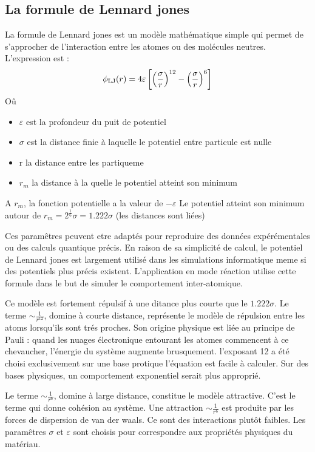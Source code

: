 \subsection{La formule de Lennard jones }
La formule de Lennard jones est un modèle mathématique simple qui permet de s'approcher de l'interaction entre les atomes ou des molécules neutres. 
L'expression est :
 \begin{displaymath} \phi_{\rm LJ} (r) = 4\varepsilon \left[ \left(\frac{\sigma}{r}\right)^{12} - \left(\frac{\sigma}{r}\right)^{6} \right]\end{displaymath}
Oû 
\begin{itemize}
    \item $\varepsilon$ est la profondeur du puit de potentiel
    \item $\sigma$ est la distance finie à laquelle le potentiel entre particule est nulle
    \item r la distance entre les partiqueme
    \item $r_m$ la distance à la quelle le potentiel atteint son minimum 
\end{itemize}

A $r_m$, la fonction potentielle a la valeur de $-\varepsilon$
Le potentiel atteint son minimum autour de $r_m = 2^{\frac{1}{6}} \sigma = 1.222 \sigma$ (les distances sont liées)

Ces paramêtres peuvent etre adaptés pour reproduire  des données expérémentales ou des calculs quantique précis.
En raison de sa simplicité de calcul, le potentiel de Lennard jones est largement utilisé dans les simulations informatique meme si des potentiels plus précis existent.
L'application en mode réaction utilise cette formule dans le but de simuler le comportement inter-atomique.

Ce modèle est fortement répulsif à une ditance plus courte que le $1.222 \sigma$.
Le terme  $\sim \frac{1}{r^{12}}$, domine à courte distance, représente le modèle de répulsion entre les atoms lorsqu'ils sont trés proches. Son origine physique est liée au principe de Pauli :  quand les nuages électronique entourant les atomes commencent à ce chevaucher, l'énergie du système augmente brusquement. l'exposant 12 a été choisi exclusivement sur une base protique l'équation est facile à calculer. Sur des bases physiques, un comportement exponentiel serait plus approprié.

Le terme   $\sim \frac{1}{r^{6}}$, domine à large distance, constitue le modèle attractive. C'est le terme qui donne cohésion au système. Une attraction  $\sim \frac{1}{r^{6}}$ est produite par les forces de dispersion de van der waals. Ce sont des interactions plutôt faibles. 
Les paramêtres $\sigma$ et $\varepsilon$ sont choisis pour correspondre aux propriétés physiques du matériau.

